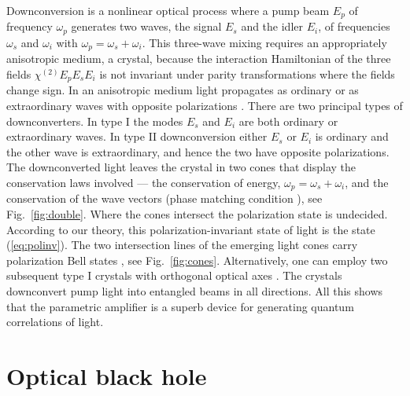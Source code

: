 \documentclass[12pt,amsmath,amssymb]{article}
\numberwithin{equation}{section}
\begin{document}
Downconversion is a nonlinear optical process
\cite{Bloembergen,Shen}
where a pump beam $E_p$ of frequency
$\omega_p$ generates two waves, the signal  $E_s$ and
the idler $E_i$, of frequencies
$\omega_s$ and $\omega_i$ with $\omega_p=\omega_s+\omega_i$.
This three-wave mixing
\cite{Shen} requires an appropriately anisotropic medium, a crystal,
because the interaction Hamiltonian of the three fields
$\chi^{(2)} E_p E_s E_i$ is not invariant under parity transformations
where the fields change sign.
In an anisotropic medium light propagates as ordinary or as
extraordinary waves with opposite polarizations \cite{BornWolf}.
There are two principal types of downconverters.
In type I \cite{Shen} the modes $E_s$ and $E_i$
are both ordinary or extraordinary waves.
In type II downconversion \cite{Shen} either $E_s$ or $E_i$
is ordinary and the other wave is extraordinary, and hence the two
have opposite polarizations.
The downconverted light leaves the crystal in two cones
that display the conservation laws involved ---
the conservation of energy, $\omega_p=\omega_s+\omega_i$,
and the conservation of the wave vectors
(phase matching condition \cite{Shen}),
see Fig.\ \ref{fig:double}.
Where the cones intersect the polarization state is undecided.
According to our theory, this polarization-invariant state of light
is the state (\ref{eq:polinv}). The two intersection lines of the
emerging light cones carry polarization Bell states \cite{Kwiat1},
see Fig.\ \ref{fig:cones}.
Alternatively, one can employ two subsequent type I crystals
with orthogonal optical axes \cite{Kwiat2}.
The crystals downconvert pump light into
entangled beams in all directions.
All this shows that the parametric amplifier is a superb device
for generating quantum correlations of light.

\section{Optical black hole}
\end{document}
